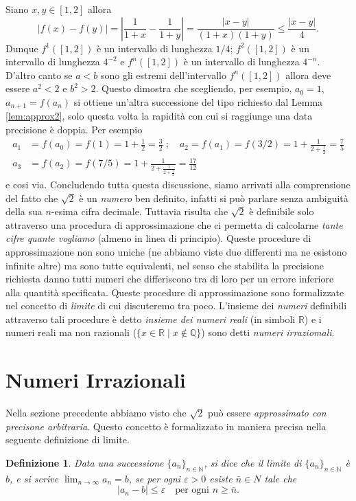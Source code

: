 \documentclass[10pt, twoside]{article}
\numberwithin{equation}{section}
\newtheorem{defin}{Definizione}
\newcommand\N{\mathbb N}
\newcommand\R{\mathbb R}
\newcommand\Q{\mathbb Q}
\begin{document}
Siano $x,y\in[1,2]$ allora
\[
|f(x)-f(y)|=\left|\frac
1{1+x}-\frac1{1+y}\right|=\frac{|x-y|}{(1+x)(1+y)}\leq \frac{|x-y|}4.
\]
Dunque $f^1([1,2])$ \`e un intervallo di lunghezza $1/4$; $f^2([1,2])$
\`e un intervallo di lunghezza  $4^{-2}$ e $f^n([1,2])$
\`e un intervallo di lunghezza  $4^{-n}$. D'altro canto se $a<b$ sono
gli estremi dell'intervallo $f^n([1,2])$ allora deve essere $a^2<2$ e
$b^2>2$. Questo dimostra che scegliendo, per esempio, $a_0=1$,
$a_{n+1}=f(a_n)$ si ottiene un'altra successione del tipo richiesto
dal Lemma \ref{lem:approx2}, solo questa volta la rapidit\`a con cui
si raggiunge una data precisione \`e doppia.
Per esempio
\[
\begin{split}
a_1&=f(a_0)=f(1)=1+\frac 12=\frac 32\;;\quad
a_2=f(a_1)=f(3/2)=1+\frac{\textstyle 1}{\textstyle 2+\frac{\textstyle
1}{\textstyle 2}}=\frac 75\\
a_3&=f(a_2)=f(7/5)=1+\frac{\textstyle 1}{\textstyle 2+\frac{\textstyle
1}{\textstyle 2+\frac{\textstyle
1}{\textstyle 2}}}=\frac {17}{12}
\end{split}
\]
e cosi via.
Concludendo tutta questa discussione, siamo arrivati alla comprensione
del fatto che $\sqrt 2$ \`e un \emph{numero} ben definito, infatti si
pu\`o parlare senza ambiguit\`a della sua $n$-esima cifra
decimale. Tuttavia risulta che $\sqrt 2$ \`e definibile
solo attraverso una procedura di approssimazione che ci permetta di calcolarne
\emph{tante cifre quante vogliamo} (almeno in linea di
principio). Queste procedure di 
approssimazione non sono uniche (ne abbiamo viste due differenti ma ne
esistono infinite altre) ma sono tutte equivalenti, nel senso che
stabilita la precisione richiesta danno tutti numeri che differiscono
tra di loro per un errore inferiore alla quantit\`a specificata.
Queste procedure di approssimazione sono formalizzate nel concetto di
\emph{limite} di cui discuteremo tra poco. L'insieme dei \emph{numeri}
definibili attraverso tali procedure \`e detto \emph{insieme dei
numeri reali} (in simboli $\R$) e i numeri reali ma non razionali
($\{x\in\R\;|\; x\not\in \Q\}$) sono detti \emph{numeri irraziomali}.

\section{\sc \normalsize Numeri Irrazionali}

Nella sezione precedente abbiamo visto che $\sqrt 2$ pu\`o essere
\emph{approssimato con precisone arbitraria}. Questo concetto \`e
formalizzato in maniera precisa nella seguente definizione di limite.
\begin{defin}
Data una successione $\{a_n\}_{n\in\N}$, si dice che il limite di
$\{a_n\}_{n\in\N}$ \`e $b$, e si scrive $\lim_{n\to\infty}a_n=b$, se
per ogni $\varepsilon>0$ esiste $\bar n\in N$ tale che
\[
|a_n-b|\leq \varepsilon\quad \text{per ogni }n\geq \bar n.
\]
\end{defin}
\end{document}
